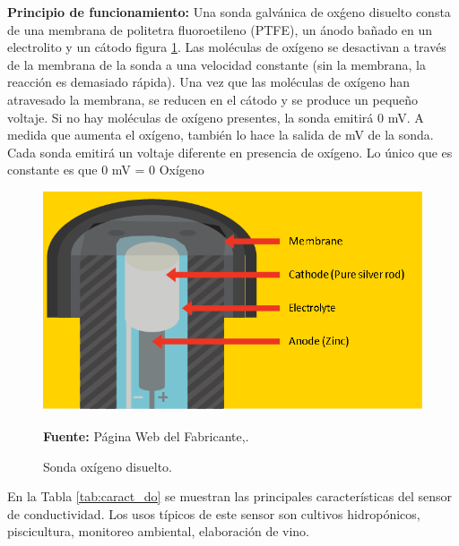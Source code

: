 \textbf{Principio de funcionamiento:} Una sonda galv\'anica de ox\'geno disuelto consta de una membrana de politetra fluoroetileno (PTFE), un \'anodo ba\~nado en un electrolito y un c\'atodo figura \ref{fig:DO_prove}.
Las mol\'eculas de ox\'igeno se desactivan a trav\'es de la membrana de la sonda a una velocidad constante (sin la membrana, la reacci\'on es demasiado r\'apida). Una vez que las mol\'eculas de ox\'igeno han atravesado la membrana, se reducen en el c\'atodo y se produce un peque\~no voltaje. Si no hay mol\'eculas de ox\'igeno presentes, la sonda emitir\'a 0 mV. A medida que aumenta el oxígeno, también lo hace la salida de mV de la sonda. Cada sonda emitirá un voltaje diferente en presencia de oxígeno. Lo único que es constante es que 0 mV = 0 Oxígeno

\begin{figure}[H]
    \centering
    \includegraphics[scale=1.5]{Imagenes/cap3/DO.png}
    \caption[Sensor de ox\'igeno disuelto]{Sonda ox\'igeno disuelto.}{\textbf{Fuente:} P\'agina Web del Fabricante,\cite{atlas_scientific_lab_nodate}.}
    \label{fig:DO_prove}
\end{figure}

En la Tabla \ref{tab:caract_do} se muestran las principales caracter\'isticas del sensor de conductividad. Los usos t\'ipicos de este sensor son cultivos hidrop\'onicos, piscicultura, monitoreo ambiental, elaboraci\'on de vino.


